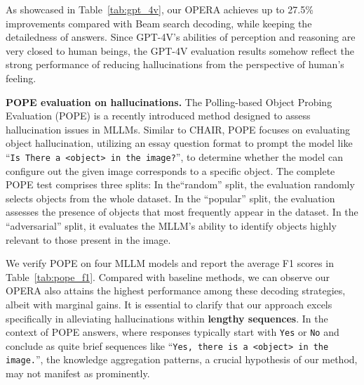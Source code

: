 \documentclass[10pt,twocolumn,letterpaper]{article}
\newcommand{\Tref}[1]{Table~\ref{#1}}
\begin{document}
As showcased in \Tref{tab:gpt_4v}, our OPERA achieves up to 27.5\% improvements compared with Beam search decoding, while keeping the detailedness of answers. 
Since GPT-4V's abilities of perception and reasoning are very closed to human beings, the GPT-4V evaluation results somehow reflect the strong performance of reducing hallucinations from the perspective of human's feeling.



\noindent\textbf{POPE evaluation on hallucinations.} 
The Polling-based Object Probing Evaluation (POPE) \cite{li2023pope} is a recently introduced method designed to assess hallucination issues in MLLMs. 
Similar to CHAIR, POPE focuses on evaluating object hallucination, utilizing an essay question format to prompt the model like ``\texttt{Is There a <object> in the image?}'', to determine whether the model can configure out the given image corresponds to a specific object.
The complete POPE test comprises three splits:
In the``random'' split, the evaluation randomly selects objects from the whole dataset.
In the ``popular'' split, the evaluation assesses the presence of objects that most frequently appear in the dataset.
In the ``adversarial'' split, it evaluates the MLLM's ability to identify objects highly relevant to those present in the image. 


We verify POPE on four MLLM models and report the average F1 scores in \Tref{tab:pope_f1}. 
Compared with baseline methods, we can observe our OPERA also attains the highest performance among these decoding strategies, albeit with marginal gains. 
It is essential to clarify that our approach excels specifically in alleviating hallucinations within \textbf{lengthy sequences}. 
In the context of POPE answers, where responses typically start with \texttt{Yes} or \texttt{No} and conclude as quite brief sequences like ``\texttt{Yes, there is a <object> in the image.}'', the knowledge aggregation patterns, a crucial hypothesis of our method, may not manifest as prominently. 
\end{document}
